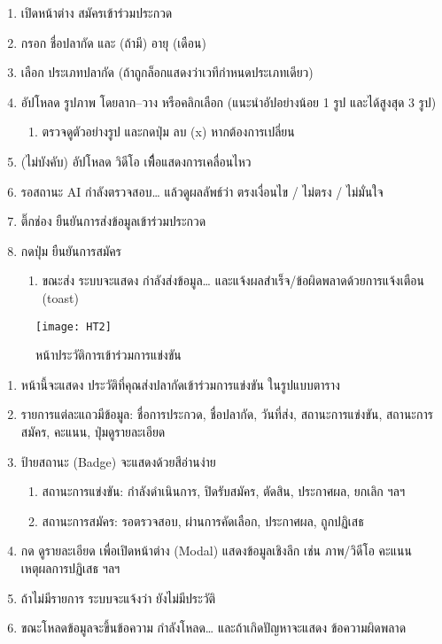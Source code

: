 \begin{sloppypar}
	\begin{enumerate}
		\item เปิดหน้าต่าง สมัครเข้าร่วมประกวด
		\item กรอก ชื่อปลากัด และ (ถ้ามี) อายุ (เดือน)
		\item เลือก ประเภทปลากัด (ถ้าถูกล็อกแสดงว่าเวทีกำหนดประเภทเดียว)
		\item อัปโหลด รูปภาพ โดยลาก–วาง หรือคลิกเลือก (แนะนำอัปอย่างน้อย 1 รูป และได้สูงสุด 3 รูป)
		\begin{enumerate}
			\item ตรวจดูตัวอย่างรูป และกดปุ่ม ลบ (x) หากต้องการเปลี่ยน
		\end{enumerate}
		\item (ไม่บังคับ) อัปโหลด วิดีโอ เพื่ือแสดงการเคลื่อนไหว
		\item รอสถานะ AI กำลังตรวจสอบ… แล้วดูผลลัพธ์ว่า ตรงเงื่อนไข / ไม่ตรง / ไม่มั่นใจ
		\item ติ๊กช่อง ยืนยันการส่งข้อมูลเข้าร่วมประกวด
		\item กดปุ่ม ยืนยันการสมัคร
		\begin{enumerate}
			\item ขณะส่ง ระบบจะแสดง กำลังส่งข้อมูล… และแจ้งผลสำเร็จ/ข้อผิดพลาดด้วยการแจ้งเตือน (toast)
		\end{enumerate}
	\end{enumerate}
\end{sloppypar}


\begin{figure}[h]
	\centering
	\texttt{[image: HT2]}
	\caption{หน้าประวัติการเข้าร่วมการแข่งขัน}
\end{figure}

\par

\begin{sloppypar}
	\begin{enumerate}
		\item หน้านี้จะแสดง ประวัติที่คุณส่งปลากัดเข้าร่วมการแข่งขัน ในรูปแบบตาราง
		\item รายการแต่ละแถวมีข้อมูล: ชื่อการประกวด, ชื่อปลากัด, วันที่ส่ง, สถานะการแข่งขัน, สถานะการสมัคร, คะแนน, ปุ่มดูรายละเอียด
		\item ป้ายสถานะ (Badge) จะแสดงด้วยสีอ่านง่าย
		\begin{enumerate}
			\item สถานะการแข่งขัน: กำลังดำเนินการ, ปิดรับสมัคร, ตัดสิน, ประกาศผล, ยกเลิก ฯลฯ
			\item สถานะการสมัคร: รอตรวจสอบ, ผ่านการคัดเลือก, ประกาศผล, ถูกปฏิเสธ
		\end{enumerate}
		\item กด ดูรายละเอียด เพื่อเปิดหน้าต่าง (Modal) แสดงข้อมูลเชิงลึก เช่น ภาพ/วิดีโอ คะแนน เหตุผลการปฏิเสธ ฯลฯ
		\item ถ้าไม่มีรายการ ระบบจะแจ้งว่า ยังไม่มีประวัติ
		\item ขณะโหลดข้อมูลจะขึ้นข้อความ กำลังโหลด… และถ้าเกิดปัญหาจะแสดง ข้อความผิดพลาด
	\end{enumerate}
\end{sloppypar}

